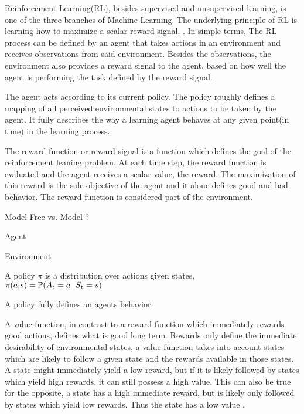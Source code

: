 Reinforcement Learning(RL), besides supervised and unsupervised learning, is one of the three branches of Machine Learning.
The underlying principle of RL is learning how to maximize a scalar reward signal. \parencite{sutton2018reinforcement}.
In simple terms, The RL process can be defined by an agent that takes actions in an environment and receives observations from said environment.
Besides the observations, the environment also provides a reward signal to the agent, based on how well the agent is performing the task defined by the reward signal. 


The agent acts according to its current policy.
The policy roughly defines a mapping of all perceived environmental states to actions to be taken by the agent.
It fully  describes the way a learning agent behaves at any given point(in time) in the learning process.\parencite{sutton2018reinforcement}\parencite{D. Silver Lec. 2}

The reward function or reward signal is a function which defines the goal of the reinforcement leaning problem.
At each time step, the reward function is evaluated and the agent receives a scalar value, the reward.
The maximization of this reward is the sole objective of the agent and it alone defines good and bad behavior.
The reward function is considered part of the environment.
\parencite{sutton2018reinforcement}



\parencite{weng2018bandit}
\parencite{sutton2018reinforcement}

Model-Free vs. Model ?

Agent

Environment

\begin{definition*}
	A policy $\pi$ is a distribution over actions given states,\\
	$\pi(a|s) = \mathbb{P}(A\textsubscript{t} = a\,|\,S\textsubscript{t} = s)$
\end{definition*}
A policy fully defines an agents behavior. 


A value function, in contrast to a reward function which immediately rewards good actions, defines what is good long term. 
Rewards only define the immediate desirability of environmental states, a value function takes into account states which are likely to follow a given state and the rewards available in those states.
A state might immediately yield a low reward, but if it is likely followed by states which yield high rewards, it can still possess a high value.
This can also be true for the opposite, a state has a high immediate reward, but is likely only followed by states which yield low rewards. Thus the state has a low value \parencite{sutton2018reinforcement}.

